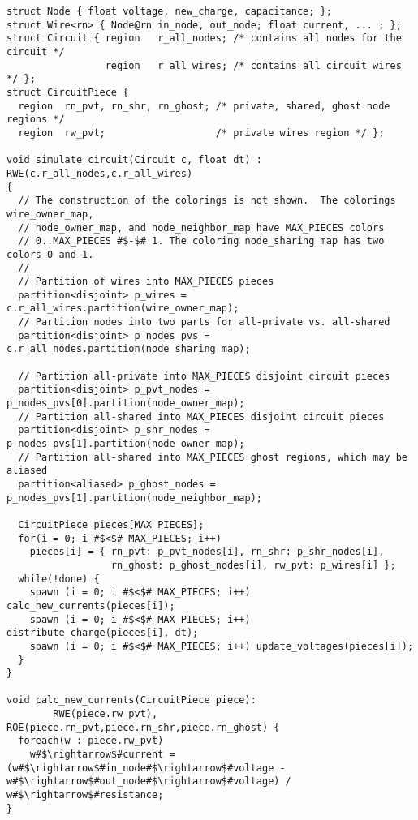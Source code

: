 \begin{lstlisting}[float={t},label={lst:code_ex},caption={Circuit simulation.}]
struct Node { float voltage, new_charge, capacitance; };
struct Wire<rn> { Node@rn in_node, out_node; float current, ... ; };
struct Circuit { region   r_all_nodes; /* contains all nodes for the circuit */
                 region   r_all_wires; /* contains all circuit wires */ };
struct CircuitPiece {
  region  rn_pvt, rn_shr, rn_ghost; /* private, shared, ghost node regions */
  region  rw_pvt;                   /* private wires region */ };

void simulate_circuit(Circuit c, float dt) : RWE(c.r_all_nodes,c.r_all_wires)
{
  // The construction of the colorings is not shown.  The colorings wire_owner_map,
  // node_owner_map, and node_neighbor_map have MAX_PIECES colors 
  // 0..MAX_PIECES #$-$# 1. The coloring node_sharing map has two colors 0 and 1.
  //
  // Partition of wires into MAX_PIECES pieces
  partition<disjoint> p_wires = c.r_all_wires.partition(wire_owner_map); 
  // Partition nodes into two parts for all-private vs. all-shared
  partition<disjoint> p_nodes_pvs = c.r_all_nodes.partition(node_sharing map);

  // Partition all-private into MAX_PIECES disjoint circuit pieces
  partition<disjoint> p_pvt_nodes = p_nodes_pvs[0].partition(node_owner_map);
  // Partition all-shared into MAX_PIECES disjoint circuit pieces
  partition<disjoint> p_shr_nodes = p_nodes_pvs[1].partition(node_owner_map);
  // Partition all-shared into MAX_PIECES ghost regions, which may be aliased
  partition<aliased> p_ghost_nodes = p_nodes_pvs[1].partition(node_neighbor_map);

  CircuitPiece pieces[MAX_PIECES];
  for(i = 0; i #$<$# MAX_PIECES; i++) 
    pieces[i] = { rn_pvt: p_pvt_nodes[i], rn_shr: p_shr_nodes[i],
                  rn_ghost: p_ghost_nodes[i], rw_pvt: p_wires[i] };
  while(!done) {
    spawn (i = 0; i #$<$# MAX_PIECES; i++) calc_new_currents(pieces[i]);
    spawn (i = 0; i #$<$# MAX_PIECES; i++) distribute_charge(pieces[i], dt);
    spawn (i = 0; i #$<$# MAX_PIECES; i++) update_voltages(pieces[i]);
  }
}

void calc_new_currents(CircuitPiece piece):
        RWE(piece.rw_pvt), ROE(piece.rn_pvt,piece.rn_shr,piece.rn_ghost) {
  foreach(w : piece.rw_pvt)
    w#$\rightarrow$#current = (w#$\rightarrow$#in_node#$\rightarrow$#voltage - w#$\rightarrow$#out_node#$\rightarrow$#voltage) / w#$\rightarrow$#resistance;
}


\end{lstlisting}
